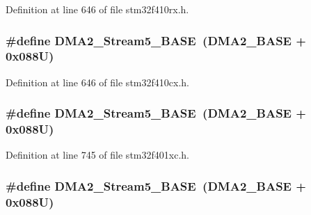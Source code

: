 Definition at line 646 of file stm32f410rx.\+h.

\subsubsection[{\texorpdfstring{D\+M\+A2\+\_\+\+Stream5\+\_\+\+B\+A\+SE}{DMA2_Stream5_BASE}}]{\setlength{\rightskip}{0pt plus 5cm}\#define D\+M\+A2\+\_\+\+Stream5\+\_\+\+B\+A\+SE~({\bf D\+M\+A2\+\_\+\+B\+A\+SE} + 0x088\+U)}\hypertarget{group___peripheral__registers__structures_gaed1460fdc407b6decfbffccb0260d0af}{}\label{group___peripheral__registers__structures_gaed1460fdc407b6decfbffccb0260d0af}


Definition at line 646 of file stm32f410cx.\+h.

\subsubsection[{\texorpdfstring{D\+M\+A2\+\_\+\+Stream5\+\_\+\+B\+A\+SE}{DMA2_Stream5_BASE}}]{\setlength{\rightskip}{0pt plus 5cm}\#define D\+M\+A2\+\_\+\+Stream5\+\_\+\+B\+A\+SE~({\bf D\+M\+A2\+\_\+\+B\+A\+SE} + 0x088\+U)}\hypertarget{group___peripheral__registers__structures_gaed1460fdc407b6decfbffccb0260d0af}{}\label{group___peripheral__registers__structures_gaed1460fdc407b6decfbffccb0260d0af}


Definition at line 745 of file stm32f401xc.\+h.

\subsubsection[{\texorpdfstring{D\+M\+A2\+\_\+\+Stream5\+\_\+\+B\+A\+SE}{DMA2_Stream5_BASE}}]{\setlength{\rightskip}{0pt plus 5cm}\#define D\+M\+A2\+\_\+\+Stream5\+\_\+\+B\+A\+SE~({\bf D\+M\+A2\+\_\+\+B\+A\+SE} + 0x088\+U)}\hypertarget{group___peripheral__registers__structures_gaed1460fdc407b6decfbffccb0260d0af}{}\label{group___peripheral__registers__structures_gaed1460fdc407b6decfbffccb0260d0af}


